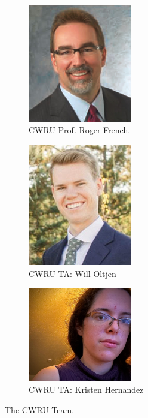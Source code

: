 \documentclass[10pt]{article} %
\begin{document}
    \begin{figure}[htbp]
      \centering
      \begin{subfigure}{0.3\linewidth}
        \centering
        \includegraphics[width=0.5\textwidth]{figs/roger_french.jpg}
        \caption{CWRU Prof. Roger French.}
        \label{fig:french}
      \end{subfigure}
      \hfill
      \begin{subfigure}{0.3\linewidth}
        \centering
        \includegraphics[width=0.5\textwidth]{figs/WillOltjen.jpg}
        \caption{CWRU TA: Will Oltjen}
        \label{fig:oltjen}
      \end{subfigure}
        \begin{subfigure}{0.3\linewidth}
        \centering
        \includegraphics[width=0.5\textwidth]{figs/KristenHernandez.png}
        \caption{CWRU TA: Kristen Hernandez}
        \label{fig:kristen}
      \end{subfigure}
      \caption{The CWRU Team.}
      \label{fig:cwru}
    \end{figure}
\end{document}
